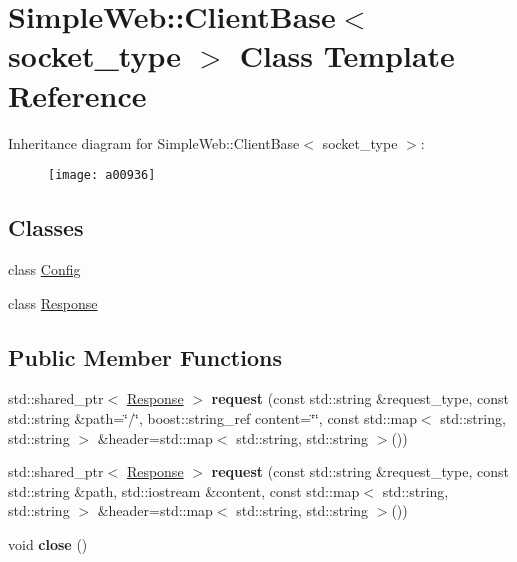 \hypertarget{a00936}{}\section{Simple\+Web\+:\+:Client\+Base$<$ socket\+\_\+type $>$ Class Template Reference}
\label{a00936}
Inheritance diagram for Simple\+Web\+:\+:Client\+Base$<$ socket\+\_\+type $>$\+:\begin{figure}[H]
\begin{center}
\leavevmode
\texttt{[image: a00936]}
\end{center}
\end{figure}
\subsection*{Classes}
\begin{DoxyCompactItemize}
\item 
class \hyperlink{a00944}{Config}
\item 
class \hyperlink{a00940}{Response}
\end{DoxyCompactItemize}
\subsection*{Public Member Functions}
\begin{DoxyCompactItemize}
\item 
\mbox{\label{a00936_ac8a838ace77f0a1a19b8cb03bdba7e74}} 
std\+::shared\+\_\+ptr$<$ \hyperlink{a00940}{Response} $>$ {\bfseries request} (const std\+::string \&request\+\_\+type, const std\+::string \&path=\char`\"{}/\char`\"{}, boost\+::string\+\_\+ref content=\char`\"{}\char`\"{}, const std\+::map$<$ std\+::string, std\+::string $>$ \&header=std\+::map$<$ std\+::string, std\+::string $>$())
\item 
\mbox{\label{a00936_aca6cb17dbea9adf0cf1daf9d1ea70f76}} 
std\+::shared\+\_\+ptr$<$ \hyperlink{a00940}{Response} $>$ {\bfseries request} (const std\+::string \&request\+\_\+type, const std\+::string \&path, std\+::iostream \&content, const std\+::map$<$ std\+::string, std\+::string $>$ \&header=std\+::map$<$ std\+::string, std\+::string $>$())
\item 
\mbox{\label{a00936_ad21735a9bda2fae6aedd811efae981e1}} 
void {\bfseries close} ()
\end{DoxyCompactItemize}

